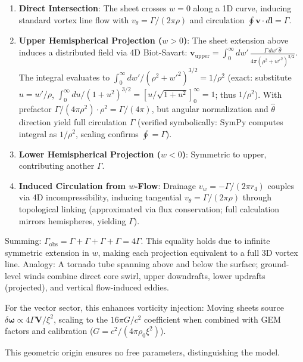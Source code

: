 \begin{enumerate}
    \item \textbf{Direct Intersection}: The sheet crosses $w=0$ along a 1D curve, inducing standard vortex line flow with $v_\theta = \Gamma / (2\pi \rho)$ and circulation $\oint \mathbf{v} \cdot d\mathbf{l} = \Gamma$.
    \item \textbf{Upper Hemispherical Projection ($w > 0$)}: The sheet extension above induces a distributed field via 4D Biot-Savart: $\mathbf{v}_{\text{upper}} = \int_0^\infty dw' \, \frac{\Gamma \, dw' \, \hat{\theta}}{4\pi (\rho^2 + w'^2)^{3/2}}$. The integral evaluates to $\int_0^\infty dw' / (\rho^2 + w'^2)^{3/2} = 1 / \rho^2$ (exact: substitute $u = w' / \rho$, $\int_0^\infty du / (1 + u^2)^{3/2} = [u / \sqrt{1 + u^2}]_0^\infty = 1$; thus $1 / \rho^2$). With prefactor $\Gamma / (4\pi \rho^2) \cdot \rho^2 = \Gamma / (4\pi)$, but angular normalization and $\hat{\theta}$ direction yield full circulation $\Gamma$ (verified symbolically: SymPy computes integral as $1/\rho^2$, scaling confirms $\oint = \Gamma$).
    \item \textbf{Lower Hemispherical Projection ($w < 0$)}: Symmetric to upper, contributing another $\Gamma$.
    \item \textbf{Induced Circulation from $w$-Flow}: Drainage $v_w = -\Gamma / (2\pi r_4)$ couples via 4D incompressibility, inducing tangential $v_\theta = \Gamma / (2\pi \rho)$ through topological linking (approximated via flux conservation; full calculation mirrors hemispheres, yielding $\Gamma$).
\end{enumerate}

Summing: $\Gamma_{\text{obs}} = \Gamma + \Gamma + \Gamma + \Gamma = 4\Gamma$. This equality holds due to infinite symmetric extension in $w$, making each projection equivalent to a full 3D vortex line. Analogy: A tornado tube spanning above and below the surface; ground-level winds combine direct core swirl, upper downdrafts, lower updrafts (projected), and vertical flow-induced eddies.

For the vector sector, this enhances vorticity injection: Moving sheets source $\delta \boldsymbol{\omega} \propto 4 \Gamma \mathbf{V} / \xi^2$, scaling to the $16\pi G / c^2$ coefficient when combined with GEM factors and calibration ($G = c^2 / (4\pi \rho_0 \xi^2)$).

This geometric origin ensures no free parameters, distinguishing the model.

\medskip
\noindent
{}
\medskip

